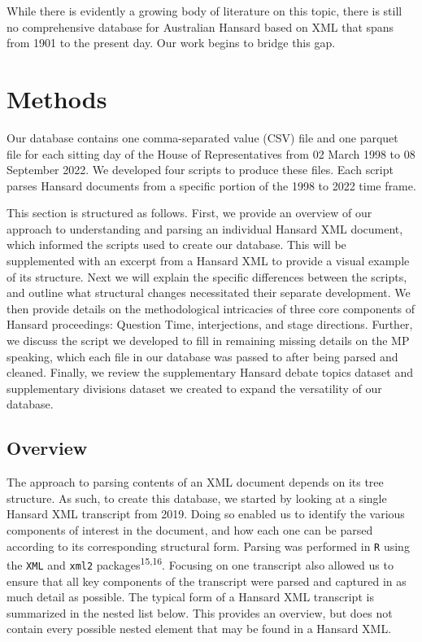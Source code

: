 \documentclass[
  letterpaper,
  DIV=11,
  numbers=noendperiod]{scrartcl}
\begin{document}
While there is evidently a growing body of literature on this topic,
there is still no comprehensive database for Australian Hansard based on
XML that spans from 1901 to the present day. Our work begins to bridge
this gap.

\hypertarget{methods}{%
\section{Methods}\label{methods}}

Our database contains one comma-separated value (CSV) file and one
parquet file for each sitting day of the House of Representatives from
02 March 1998 to 08 September 2022. We developed four scripts to produce
these files. Each script parses Hansard documents from a specific
portion of the 1998 to 2022 time frame.

This section is structured as follows. First, we provide an overview of
our approach to understanding and parsing an individual Hansard XML
document, which informed the scripts used to create our database. This
will be supplemented with an excerpt from a Hansard XML to provide a
visual example of its structure. Next we will explain the specific
differences between the scripts, and outline what structural changes
necessitated their separate development. We then provide details on the
methodological intricacies of three core components of Hansard
proceedings: Question Time, interjections, and stage directions.
Further, we discuss the script we developed to fill in remaining missing
details on the MP speaking, which each file in our database was passed
to after being parsed and cleaned. Finally, we review the supplementary
Hansard debate topics dataset and supplementary divisions dataset we
created to expand the versatility of our database.

\hypertarget{sec-overview}{%
\subsection{Overview}\label{sec-overview}}

The approach to parsing contents of an XML document depends on its tree
structure. As such, to create this database, we started by looking at a
single Hansard XML transcript from 2019. Doing so enabled us to identify
the various components of interest in the document, and how each one can
be parsed according to its corresponding structural form. Parsing was
performed in \texttt{R} using the \texttt{XML} and \texttt{xml2}
packages\textsuperscript{15,16}. Focusing on one transcript also allowed
us to ensure that all key components of the transcript were parsed and
captured in as much detail as possible. The typical form of a Hansard
XML transcript is summarized in the nested list below. This provides an
overview, but does not contain every possible nested element that may be
found in a Hansard XML.
\end{document}
